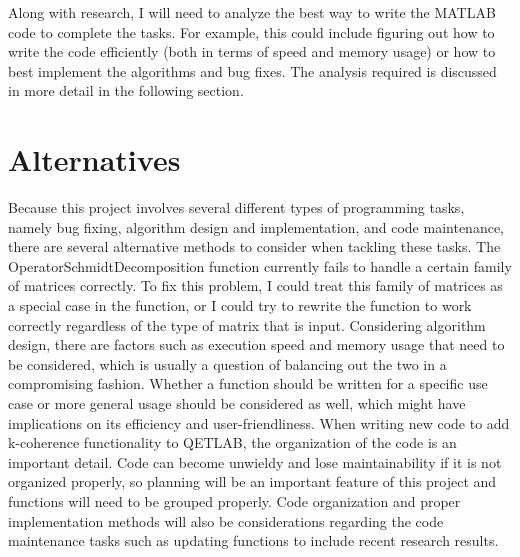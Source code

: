 \documentclass[12pt]{article}
\begin{document}
Along with research, I will need to analyze the best way to write the MATLAB code to complete the tasks. For example, this could include figuring out how to write the code efficiently (both in terms of speed and memory usage) or how to best implement the algorithms and bug fixes. The analysis required is discussed in more detail in the following section.


\section{Alternatives}
Because this project involves several different types of programming tasks, namely bug fixing, algorithm design and implementation, and code maintenance, there are several alternative methods to consider when tackling these tasks. The OperatorSchmidtDecomposition function currently fails to handle a certain family of matrices correctly. To fix this problem, I could treat this family of matrices as a special case in the function, or I could try to rewrite the function to work correctly regardless of the type of matrix that is input. Considering algorithm design, there are factors such as execution speed and memory usage that need to be considered, which is usually a question of balancing out the two in a compromising fashion. Whether a function should be written for a specific use case or more general usage should be considered as well, which might have implications on its efficiency and user-friendliness. When writing new code to add k-coherence functionality to QETLAB, the organization of the code is an important detail. Code can become unwieldy and lose maintainability if it is not organized properly, so planning will be an important feature of this project and functions will need to be grouped properly. Code organization and proper implementation methods will also be considerations regarding the code maintenance tasks such as updating functions to include recent research results.

\end{document}
